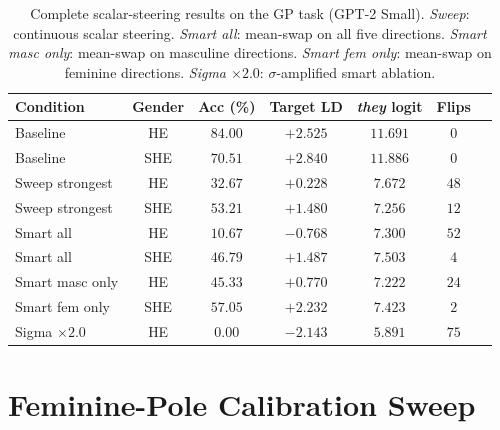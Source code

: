 \begin{table}[h]
\centering
\small
\caption{Complete scalar-steering results on the GP task
(GPT-2 Small). \emph{Sweep}: continuous scalar steering.
\emph{Smart all}: mean-swap on all five directions.
\emph{Smart masc only}: mean-swap on masculine directions.
\emph{Smart fem only}: mean-swap on feminine directions.
\emph{Sigma $\times 2.0$}: $\sigma$-amplified smart ablation.}
\label{tab:bc_full}
\begin{tabular}{lcccccc}
\toprule
Condition         & Gender & Acc (\%) & Target LD & \emph{they} logit & Flips \\
\midrule
Baseline          & HE     & $84.00$ & $+2.525$ & $11.691$ & $0$  \\
Baseline          & SHE    & $70.51$ & $+2.840$ & $11.886$ & $0$  \\
Sweep strongest   & HE     & $32.67$ & $+0.228$ & $7.672$  & $48$ \\
Sweep strongest   & SHE    & $53.21$ & $+1.480$ & $7.256$  & $12$ \\
Smart all         & HE     & $10.67$ & $-0.768$ & $7.300$  & $52$ \\
Smart all         & SHE    & $46.79$ & $+1.487$ & $7.503$  & $4$  \\
Smart masc only   & HE     & $45.33$ & $+0.770$ & $7.222$  & $24$ \\
Smart fem only    & SHE    & $57.05$ & $+2.232$ & $7.423$  & $2$  \\
Sigma $\times 2.0$& HE     & $0.00$  & $-2.143$ & $5.891$  & $75$ \\
\bottomrule
\end{tabular}
\end{table}

\section{Feminine-Pole Calibration Sweep}
\label{app:fem_calib}


